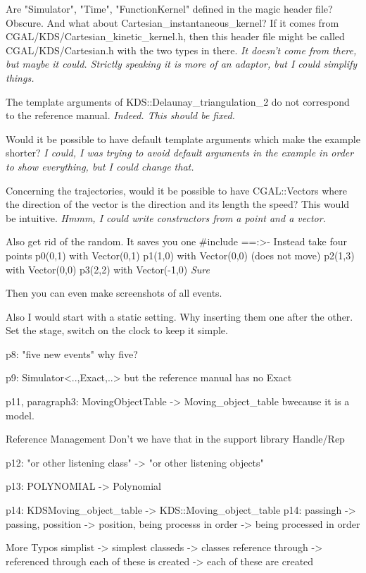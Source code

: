 Are "Simulator", "Time", "FunctionKernel" defined in the
magic header file? Obscure.
And what about Cartesian_instantaneous_kernel? If it comes
from CGAL/KDS/Cartesian_kinetic_kernel.h, then this
header file might be called CGAL/KDS/Cartesian.h
with the two types in there.
\textit{It doesn't come from there, but maybe it could. Strictly speaking it is more of an adaptor, but I could simplify things. }


The template arguments of KDS::Delaunay_triangulation_2
do not correspond to the reference manual.
\textit{Indeed. This should be fixed.}

Would it be possible to have default template arguments which
make the example shorter?
\textit{I could, I was trying to avoid default arguments in the example in order to show everything, but I could change that.}

Concerning the trajectories, would it be possible to have CGAL::Vectors
where the direction of the vector is the direction and its length
the speed? This would be intuitive.
\textit{Hmmm, I could write constructors from a point and a vector.}

Also get rid of the random. It saves you one #include ==:>-
Instead take four points
p0(0,1) with Vector(0,1)
p1(1,0) with Vector(0,0) (does not move)
p2(1,3) with Vector(0,0)
p3(2,2) with Vector(-1,0)
\textit{Sure}

Then you can even make screenshots of all events.

Also I would start with a static setting. Why inserting them
one after the other. Set the stage, switch on the clock
to keep it simple.


p8: "five new events" why five?

p9: Simulator<..,Exact,..>  but the reference manual has no Exact

p11, paragraph3: MovingObjectTable -> Moving_object_table bwecause it is a model.


Reference Management  Don't we have that in the support library Handle/Rep

p12: "or other listening class" -> "or other listening objects"


p13: POLYNOMIAL -> Polynomial

p14: KDSMoving_object_table -> KDS::Moving_object_table
p14: passingh -> passing, possition -> position, being processs in order -> being processed in order

More Typos
simplist -> simplest
classeds -> classes
reference through -> referenced through
each of these is created -> each of these are created


